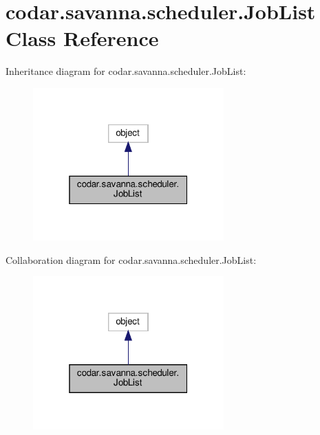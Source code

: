 \hypertarget{classcodar_1_1savanna_1_1scheduler_1_1_job_list}{}\section{codar.\+savanna.\+scheduler.\+Job\+List Class Reference}
\label{classcodar_1_1savanna_1_1scheduler_1_1_job_list}


Inheritance diagram for codar.\+savanna.\+scheduler.\+Job\+List\+:
\nopagebreak
\begin{figure}[H]
\begin{center}
\leavevmode
\includegraphics[width=208pt]{classcodar_1_1savanna_1_1scheduler_1_1_job_list__inherit__graph}
\end{center}
\end{figure}


Collaboration diagram for codar.\+savanna.\+scheduler.\+Job\+List\+:
\nopagebreak
\begin{figure}[H]
\begin{center}
\leavevmode
\includegraphics[width=208pt]{classcodar_1_1savanna_1_1scheduler_1_1_job_list__coll__graph}
\end{center}
\end{figure}
